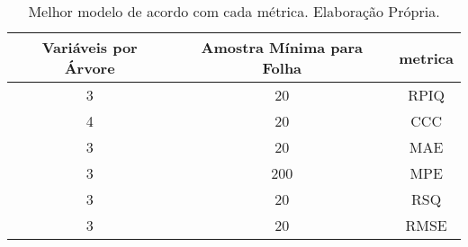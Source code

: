 \begin{table}[H]

\caption{\label{tab:tabela_metricas}Melhor modelo de acordo com cada métrica. Elaboração Própria.}
\centering
\begin{tabular}[t]{c|c|c}
\hline
Variáveis por Árvore & Amostra Mínima para Folha & metrica\\
\hline
3 & 20 & RPIQ\\
\hline
4 & 20 & CCC\\
\hline
3 & 20 & MAE\\
\hline
3 & 200 & MPE\\
\hline
3 & 20 & RSQ\\
\hline
3 & 20 & RMSE\\
\hline
\end{tabular}
\end{table}
